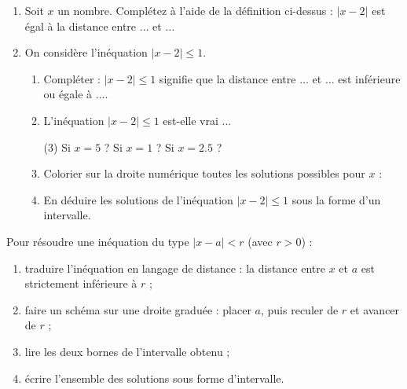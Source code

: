 \documentclass[10pt,a4paper]{article}
\begin{document}
\begin{exo}
    \begin{enumerate}
        \item Soit \(x\) un nombre. Complétez à l'aide de la définition ci-dessus : \(|x-2|\) est égal à la distance entre \(\dots\) et \(\dots\)
        \item On considère l'inéquation \(|x-2|\leq 1\).\begin{enumerate}
            \item Compléter : \(|x-2|\leq 1\) signifie que la distance entre \(\dots\) et \(\dots\) est inférieure ou égale à \(\dots\).
            \item L'inéquation \(|x-2|\leq 1\) est-elle vrai ...\begin{tasks}[label=(\roman*)]  (3)
                \task Si \(x=5\) ?
                \task Si \(x=1\) ?
                \task Si \(x=2.5\) ?
            \end{tasks}
            \item Colorier sur la droite numérique toutes les solutions possibles pour \(x\) :
            
                \vspace{0.3cm}
    \item En déduire les solutions de l'inéquation \(|x-2|\leq 1\) sous la forme d'un intervalle.
        \end{enumerate}
    \end{enumerate}
\end{exo}

\vspace{0.5cm}

\begin{met}
    Pour résoudre une inéquation du type \(|x-a| < r\) (avec \(r>0\)) :
    \begin{enumerate}
        \item traduire l'inéquation en langage de distance : \og la distance entre \(x\) et \(a\) est strictement inférieure à \(r\) \fg{} ;
        \item faire un schéma sur une droite graduée : placer \(a\), puis reculer de \(r\) et avancer de \(r\) ;
        \item lire les deux bornes de l'intervalle obtenu ;
        \item écrire l'ensemble des solutions sous forme d'intervalle.
    \end{enumerate}
\end{met}
\end{document}
